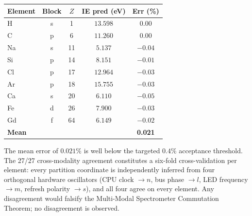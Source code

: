 \documentclass[11pt,twocolumn,a4paper]{article}
\theoremstyle{axiomstyle}
\theoremstyle{conseqstyle}
\theoremstyle{definition}
\theoremstyle{remark}
\begin{document}
\begin{center}\small
\begin{tabular}{lcccc}
\toprule
Element & Block & $Z$ & IE pred (eV) & Err (\%)\\
\midrule
H  & s & 1  & $13.598$ & $0.00$\\
C  & p & 6  & $11.260$ & $0.00$\\
Na & s & 11 & $5.137$  & $-0.04$\\
Si & p & 14 & $8.151$  & $-0.01$\\
Cl & p & 17 & $12.964$ & $-0.03$\\
Ar & p & 18 & $15.755$ & $-0.03$\\
Ca & s & 20 & $6.110$  & $-0.05$\\
Fe & d & 26 & $7.900$  & $-0.03$\\
Gd & f & 64 & $6.149$  & $-0.02$\\
\midrule
\textbf{Mean} & & & & \textbf{0.021}\\
\bottomrule
\end{tabular}
\end{center}

The mean error of $0.021\%$ is well below the targeted $0.4\%$ acceptance threshold. The 27/27 cross-modality agreement constitutes a six-fold cross-validation per element: every partition coordinate is independently inferred from four orthogonal hardware oscillators (CPU clock $\to n$, bus phase $\to l$, LED frequency $\to m$, refresh polarity $\to s$), and all four agree on every element. Any disagreement would falsify the Multi-Modal Spectrometer Commutation Theorem; no disagreement is observed.
\end{document}

